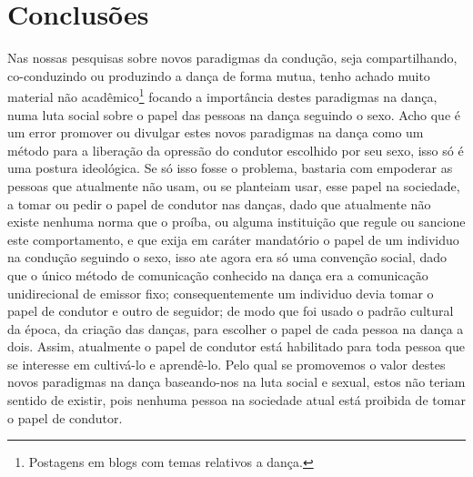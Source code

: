 \documentclass[a4paper,10pt]{article}
\begin{document}
\section{Conclusões}
Nas nossas pesquisas sobre novos paradigmas da condução, seja compartilhando, 
co-conduzindo ou produzindo a dança de forma mutua, 
tenho achado muito material não 
acadêmico\footnote{Postagens em blogs com temas relativos a dança.} 
focando a importância destes paradigmas na dança, 
numa luta social sobre o papel das pessoas na dança seguindo o sexo.
Acho que é um error promover ou divulgar estes novos paradigmas na dança 
como um método para a liberação da opressão do condutor escolhido por seu sexo, 
isso só é uma postura ideológica. 
Se só isso fosse o problema, 
bastaria com empoderar as pessoas que atualmente não usam, 
ou se planteiam usar, esse papel na sociedade, 
a tomar ou pedir o papel de condutor nas danças, 
dado que atualmente não existe nenhuma norma que o proíba,
ou alguma instituição que regule ou sancione este comportamento,
e que exija em caráter mandatório o papel de um individuo na condução seguindo o sexo,
isso ate agora era só uma convenção social, 
dado que o único método de comunicação conhecido na dança era a comunicação unidirecional de emissor fixo;
consequentemente um individuo devia tomar o papel de condutor e outro de seguidor;
de modo que foi usado o padrão cultural da época, da criação das danças, 
para escolher o papel de cada pessoa na dança a dois. 
Assim,  atualmente o papel de condutor está habilitado para toda pessoa que se interesse em 
cultivá-lo e aprendê-lo. 
Pelo qual se promovemos o valor destes novos paradigmas na dança baseando-nos na luta social e sexual, 
estos não teriam sentido de existir, 
pois nenhuma pessoa na sociedade atual está proibida de tomar o papel de condutor.



\medskip
 
\printbibliography
\end{document}
